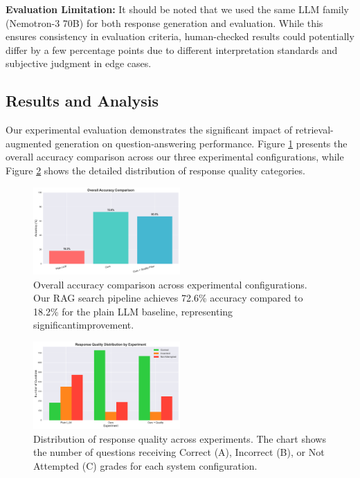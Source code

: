 \documentclass[fleqn,moreauthors,10pt]{ds_report}
\begin{document}
\textbf{Evaluation Limitation:} It should be noted that we used the same LLM family (Nemotron-3 70B) for both response generation and evaluation. While this ensures consistency in evaluation criteria, human-checked results could potentially differ by a few percentage points due to different interpretation standards and subjective judgment in edge cases.

\subsection*{Results and Analysis}

Our experimental evaluation demonstrates the significant impact of retrieval-augmented generation on question-answering performance. Figure \ref{fig:accuracy_comparison} presents the overall accuracy comparison across our three experimental configurations, while Figure \ref{fig:grade_distribution} shows the detailed distribution of response quality categories.

\begin{figure}[h]
\centering
\includegraphics[width=0.5\textwidth]{accuracy_comparison.pdf}
\caption{Overall accuracy comparison across experimental configurations. Our RAG search pipeline achieves 72.6\% accuracy compared to 18.2\% for the plain LLM baseline, representing significantimprovement.}
\label{fig:accuracy_comparison}
\end{figure}

\begin{figure}[h]
\centering
\includegraphics[width=0.5\textwidth]{grade_distribution.pdf}
\caption{Distribution of response quality across experiments. The chart shows the number of questions receiving Correct (A), Incorrect (B), or Not Attempted (C) grades for each system configuration.}
\label{fig:grade_distribution}
\end{figure}
\end{document}
